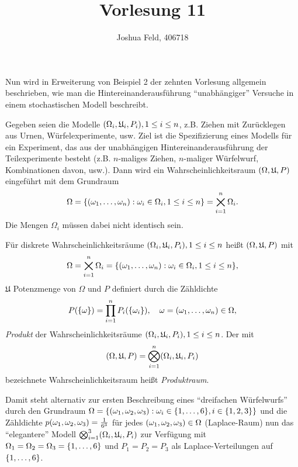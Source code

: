 \documentclass{lecture}
\institute{Institut für Statistik und Wirtschaftsmathematik}
\title{Vorlesung 11}
\author{Joshua Feld, 406718}
\begin{document}
    \maketitle


    Nun wird in Erweiterung von Beispiel 2 der zehnten Vorlesung allgemein beschrieben, wie man die Hintereinanderausführung ``unabhängiger'' Versuche in einem stochastischen Modell beschreibt.

    Gegeben seien die Modelle \(\parentheses*{\Omega_i, \mathfrak{U}_i, P_i}, 1 \le i \le n\), z.B. Ziehen mit Zurücklegen aus Urnen, Würfelexperimente, usw.
    Ziel ist die Spezifizierung eines Modells für ein Experiment, das aus der unabhängigen Hintereinanderausführung der Teilexperimente besteht (z.B. \(n\)-maliges Ziehen, \(n\)-maliger Würfelwurf, Kombinationen davon, usw.).
    Dann wird ein Wahrscheinlichkeitsraum \(\parentheses*{\Omega, \mathfrak{U}, P}\) eingeführt mit dem Grundraum
    \[
        \Omega = \braces*{\parentheses*{\omega_1, \ldots, \omega_n} : \omega_i \in \Omega_i, 1 \le i \le n} = \bigtimes_{i = 1}^n \Omega_i.
    \]
    Die Mengen \(\Omega_i\) müssen dabei nicht identisch sein.

    \begin{definition}
        Für diskrete Wahrscheinlichkeitsräume \(\parentheses*{\Omega_i, \mathfrak{U}_i, P_i}, 1 \le i \le n\) heißt \(\parentheses*{\Omega, \mathfrak{U}, P}\) mit
        \[
            \Omega = \bigtimes_{i = 1}^n \Omega_i = \braces*{\parentheses*{\omega_1, \ldots, \omega_n} : \omega_i \in \Omega_i, 1 \le i \le n},
        \]
        \(\mathfrak{U}\) Potenzmenge von \(\Omega\) und \(P\) definiert durch die Zähldichte
        \[
            P\parentheses*{\braces*{\omega}} = \prod_{i = 1}^n P_i\parentheses*{\braces*{\omega_i}}, \quad \omega = \parentheses*{\omega_1, \ldots, \omega_n} \in \Omega,
        \]
        \emph{Produkt} der Wahrscheinlichkeitsräume \(\parentheses*{\Omega_i, \mathfrak{U}_i, P_i}, 1 \le i \le n\).
        Der mit
        \[
            \parentheses*{\Omega, \mathfrak{U}, P} = \bigotimes_{i = 1}^n \parentheses*{\Omega_i, \mathfrak{U}_i, P_i} 
        \]
        bezeichnete Wahrscheinlichkeitsraum heißt \emph{Produktraum}.
    \end{definition}

    Damit steht alternativ zur ersten Beschreibung eines ``dreifachen Würfelwurfs'' durch den Grundraum \(\Omega = \braces*{\parentheses*{\omega_1, \omega_2, \omega_3} : \omega_i \in \braces*{1, \ldots, 6}, i \in \braces*{1, 2, 3}}\) und die Zähldichte \(p\parentheses*{\omega_1, \omega_2, \omega_3} = \frac{1}{6^3}\) für jedes \(\parentheses*{\omega_1, \omega_2, \omega_3} \in \Omega\) (Laplace-Raum) nun das ``elegantere'' Modell \(\bigotimes_{i = 1}^3 \parentheses*{\Omega_i, \mathfrak{U}_i, P_i}\) zur Verfügung mit \(\Omega_1 = \Omega_2 = \Omega_3 = \braces*{1, \ldots, 6}\) und \(P_1 = P_2 = P_3\) als Laplace-Verteilungen auf \(\braces*{1, \ldots, 6}\).
\end{document}
